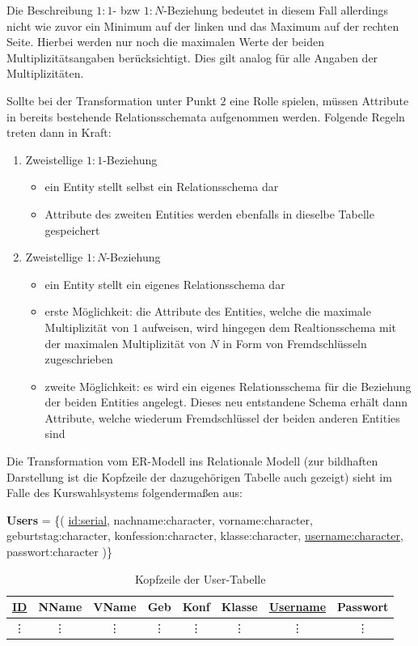 Die Beschreibung $1:1$- bzw $1:N$-Beziehung bedeutet in diesem Fall allerdings nicht wie zuvor ein Minimum auf der linken und das Maximum auf der rechten Seite. 
Hierbei werden nur noch die maximalen Werte der beiden Multiplizitätsangaben berücksichtigt. Dies gilt analog für alle Angaben der Multiplizitäten.

Sollte bei der Transformation unter Punkt $2$ eine Rolle spielen, müssen Attribute in bereits bestehende Relationsschemata aufgenommen werden. Folgende Regeln treten dann in Kraft:
\begin{enumerate}
 \item Zweistellige $1:1$-Beziehung
 \begin{itemize}
  \item ein Entity stellt selbst ein Relationsschema dar
  \item Attribute des zweiten Entities werden ebenfalls in dieselbe Tabelle gespeichert
 \end{itemize}
 \item Zweistellige $1:N$-Beziehung
 \begin{itemize}
  \item ein Entity stellt ein eigenes Relationsschema dar
  \item erste Möglichkeit: die Attribute des Entities, welche die maximale Multiplizität von $1$ aufweisen, wird hingegen dem Realtionsschema mit der maximalen Multiplizität von $N$ in Form von Fremdschlüsseln zugeschrieben
  \item zweite Möglichkeit: es wird ein eigenes Relationsschema für die Beziehung der beiden Entities angelegt. Dieses neu entstandene Schema erhält dann Attribute, welche wiederum Fremdschlüssel der beiden anderen Entities sind
 \end{itemize}
\end{enumerate}

Die Transformation vom \ac{ER-Modell} ins Relationale Modell (zur bildhaften Darstellung ist die Kopfzeile der dazugehörigen Tabelle auch gezeigt) sieht im Falle des Kurswahlsystems folgendermaßen aus:

\textbf{Users} = \{( \underline{id:serial}, nachname:character, vorname:character, geburtstag:character, konfession:character, klasse:character, \underline{username:character}, passwort:character )\}

\begin{table}[H]
\begin{center}
	\begin{tabular}{|c|c|c|c|c|c|c|c|}\hline
		\textbf{\underline{ID}} & \textbf{NName} & \textbf{VName} & \textbf{Geb} & \textbf{Konf} & \textbf{Klasse} & \textbf{\underline{Username}} & \textbf{Passwort} \\ \hline
		\vdots & \vdots & \vdots & \vdots & \vdots & \vdots & \vdots & \vdots \\
	\end{tabular}
	\caption{Kopfzeile der User-Tabelle}
\end{center}
\end{table}

